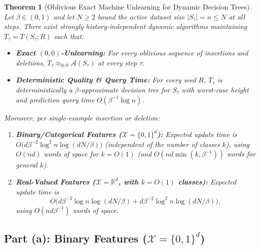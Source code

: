 \documentclass[11pt]{article}
\newtheorem{theorem}{Theorem}
\theoremstyle{definition}
\newcommand{\R}{\mathbb{R}}
\newcommand{\calA}{\mathcal{A}}
\newcommand{\calX}{\mathcal{X}}
\begin{document}
\begin{theorem}[Oblivious Exact Machine Unlearning for Dynamic Decision Trees]
\label{thm:oblivious}
Let $\beta \in (0, 1)$ and let $N \ge 2$ bound the active dataset size $|S_\tau| = n \le N$ at all steps. There exist strongly history-independent dynamic algorithms maintaining $T_\tau = T(S_\tau; R)$ such that:
\begin{itemize}[leftmargin=1.5em,itemsep=2pt]
    \item \textbf{Exact $(0,0)$-Unlearning:} For every oblivious sequence of insertions and deletions, $T_\tau \approx_{0,0} \calA(S_\tau)$ at every step $\tau$.
    \item \textbf{Deterministic Quality \& Query Time:} For every seed $R$, $T_\tau$ is deterministically a $\beta$-approximate decision tree for $S_\tau$ with worst-case height and prediction query time $O(\beta^{-1} \log n)$.
\end{itemize}
Moreover, per single-example insertion or deletion:
\begin{enumerate}[label=(\alph*),leftmargin=1.8em,itemsep=2pt]
    \item \textbf{Binary/Categorical Features ($\calX = \{0,1\}^d$):} Expected update time is $O\big(d \beta^{-2} \log^2 n \log(dN/\beta)\big)$ (independent of the number of classes $k$), using $O(nd)$ words of space for $k = O(1)$ (and $O(nd \min(k, \beta^{-1}))$ words for general $k$).
    \item \textbf{Real-Valued Features ($\calX = \R^d$, with $k = O(1)$ classes):} Expected update time is
    \[
        O\Big(d \beta^{-3} \log n \log(dN/\beta) + d \beta^{-2} \log^2 n \log(dN/\beta)\Big),
    \]
    using $O(nd\beta^{-1})$ words of space.
\end{enumerate}
\end{theorem}

\subsection{Part (a): Binary Features (\texorpdfstring{$\calX = \{0,1\}^d$}{X = \{0,1\}\^{}d})}
\end{document}

